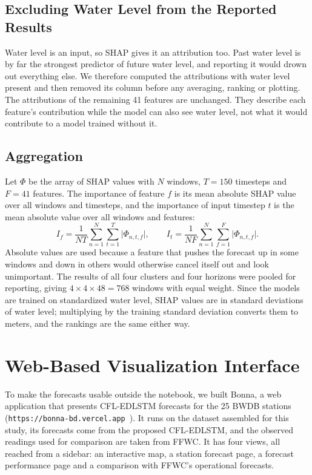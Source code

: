 \subsection{Excluding Water Level from the Reported Results}
\label{sec:3.17.5}

Water level is an input, so SHAP gives it an attribution too. Past water level
is by far the strongest predictor of future water level, and reporting it would
drown out everything else. We therefore computed the attributions with water
level present and then removed its column before any averaging, ranking or
plotting. The attributions of the remaining 41 features are unchanged. They
describe each feature's contribution while the model can also see water level,
not what it would contribute to a model trained without it.

\subsection{Aggregation}
\label{sec:3.17.6}

Let $\Phi$ be the array of SHAP values with $N$ windows, $T=150$ timesteps and
$F=41$ features. The importance of feature $f$ is its mean absolute SHAP value
over all windows and timesteps, and the importance of input timestep $t$ is the
mean absolute value over all windows and features:
\begin{equation}
I_f = \frac{1}{NT}\sum_{n=1}^{N}\sum_{t=1}^{T}\bigl|\Phi_{n,t,f}\bigr|,
\qquad
I_t = \frac{1}{NF}\sum_{n=1}^{N}\sum_{f=1}^{F}\bigl|\Phi_{n,t,f}\bigr|.
\label{eq:shap_importance}
\end{equation}
Absolute values are used because a feature that pushes the forecast up in some
windows and down in others would otherwise cancel itself out and look
unimportant. The results of all four clusters and four horizons were pooled for
reporting, giving $4 \times 4 \times 48 = 768$ windows with equal weight. Since
the models are trained on standardized water level, SHAP values are in standard
deviations of water level; multiplying by the training standard deviation
converts them to meters, and the rankings are the same either way.

\section{Web-Based Visualization Interface}
\label{sec:3.18}
\label{sec:web_interface}

To make the forecasts usable outside the notebook, we built Bonna, a web
application that presents CFL-EDLSTM forecasts for the 25 BWDB stations
(\texttt{https://bonna-bd.vercel.app}~\cite{bonna_app}). It runs on the dataset
assembled for this study, its forecasts come from the proposed CFL-EDLSTM, and
the observed readings used for comparison are taken from FFWC. It has four
views, all reached from a sidebar: an interactive map, a station forecast page,
a forecast performance page and a comparison with FFWC's operational forecasts.

